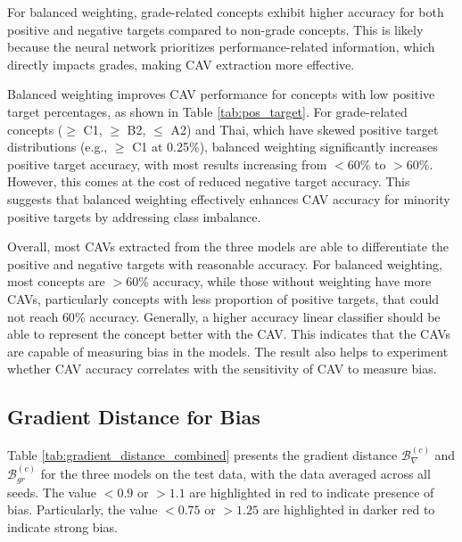 For balanced weighting, grade-related concepts exhibit higher accuracy for both positive and negative targets compared to non-grade concepts. This is likely because the neural network prioritizes performance-related information, which directly impacts grades, making CAV extraction more effective.

Balanced weighting improves CAV performance for concepts with low positive target percentages, as shown in Table \ref{tab:pos_target}. For grade-related concepts ($\geq$ C1, $\geq$ B2, $\leq$ A2) and Thai, which have skewed positive target distributions (e.g., $\geq$ C1 at 0.25\%), balanced weighting significantly increases positive target accuracy, with most results increasing from $< 60\%$ to $> 60\%$. However, this comes at the cost of reduced negative target accuracy. This suggests that balanced weighting effectively enhances CAV accuracy for minority positive targets by addressing class imbalance.

Overall, most CAVs extracted from the three models are able to differentiate the positive and negative targets with reasonable accuracy. For balanced weighting, most concepts are $> 60\%$ accuracy, while those without weighting have more CAVs, particularly concepts with less proportion of positive targets, that could not reach $60\%$ accuracy. Generally, a higher accuracy linear classifier should be able to represent the concept better with the CAV. This indicates that the CAVs are capable of measuring bias in the models. The result also helps to experiment whether CAV accuracy correlates with the sensitivity of CAV to measure bias.

\subsection{Gradient Distance for Bias} \label{sec:gradient_distance}

Table \ref{tab:gradient_distance_combined} presents the gradient distance $\mathcal{B}^{(c)}_{\nabla}$ and $\mathcal{B}^{(c)}_{gr}$ for the three models on the test data, with the data averaged across all seeds. The value $< 0.9$ or $> 1.1$ are highlighted in red to indicate presence of bias. Particularly, the value $< 0.75$ or $> 1.25$ are highlighted in darker red to indicate strong bias.

